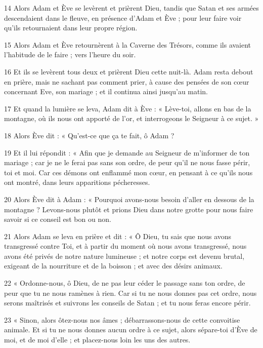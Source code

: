 \par 14 Alors Adam et Ève se levèrent et prièrent Dieu, tandis que Satan et ses armées descendaient dans le fleuve, en présence d'Adam et Ève ; pour leur faire voir qu'ils retournaient dans leur propre région.

\par 15 Alors Adam et Ève retournèrent à la Caverne des Trésors, comme ils avaient l'habitude de le faire ; vers l'heure du soir.

\par 16 Et ils se levèrent tous deux et prièrent Dieu cette nuit-là. Adam resta debout en prière, mais ne sachant pas comment prier, à cause des pensées de son cœur concernant Eve, son mariage ; et il continua ainsi jusqu'au matin.

\par 17 Et quand la lumière se leva, Adam dit à Ève : « Lève-toi, allons en bas de la montagne, où ils nous ont apporté de l'or, et interrogeons le Seigneur à ce sujet. »

\par 18 Alors Ève dit : « Qu'est-ce que ça te fait, ô Adam ?

\par 19 Et il lui répondit : « Afin que je demande au Seigneur de m'informer de ton mariage ; car je ne le ferai pas sans son ordre, de peur qu'il ne nous fasse périr, toi et moi. Car ces démons ont enflammé mon cœur, en pensant à ce qu’ils nous ont montré, dans leurs apparitions pécheresses.

\par 20 Alors Ève dit à Adam : « Pourquoi avons-nous besoin d'aller en dessous de la montagne ? Levons-nous plutôt et prions Dieu dans notre grotte pour nous faire savoir si ce conseil est bon ou non.

\par 21 Alors Adam se leva en prière et dit : « Ô Dieu, tu sais que nous avons transgressé contre Toi, et à partir du moment où nous avons transgressé, nous avons été privés de notre nature lumineuse ; et notre corps est devenu brutal, exigeant de la nourriture et de la boisson ; et avec des désirs animaux.

\par 22 « Ordonne-nous, ô Dieu, de ne pas leur céder le passage sans ton ordre, de peur que tu ne nous ramènes à rien. Car si tu ne nous donnes pas cet ordre, nous serons maîtrisés et suivrons les conseils de Satan ; et tu nous feras encore périr.

\par 23 « Sinon, alors ôtez-nous nos âmes ; débarrassons-nous de cette convoitise animale. Et si tu ne nous donnes aucun ordre à ce sujet, alors sépare-toi d'Ève de moi, et de moi d'elle ; et placez-nous loin les uns des autres.

